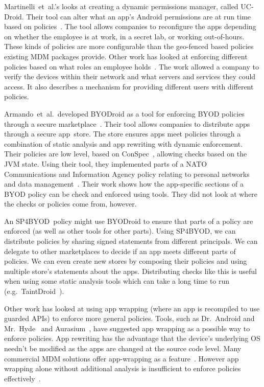 \documentclass{llncs}
\makeatletter
\newcommand{\etal}{et~al.\@}
\newcommand{\AppPAL}[0]{SP4BYOD}
\makeatother
\begin{document}
Martinelli~\etal{}'s looks at creating a dynamic permissions manager, called UC-Droid.
Their tool can alter what an app's Android permissions are at run time based on policies~\cite{martinelli_enhancing_2016}.
The tool allows companies to reconfigure the apps depending on whether the employee is at work, in a secret lab, or working out-of-hours.
These kinds of policies are more configurable than the geo-fenced based policies existing MDM packages provide.
Other work has looked at enforcing different policies based on what roles an employee holds~\cite{costantino_towards_2013}.
The work allowed a company to verify the devices within their network and what servers and services they could access.
It also describes a mechanism for providing different users with different policies.

Armando~\etal~developed BYODroid as a tool for enforcing BYOD policies through a secure marketplace~\cite{armando_enabling_2014}.
Their tool allows companies to distribute apps through a secure app~store.
The store ensures apps meet policies through a combination of static analysis and app rewriting with dynamic enforcement.
Their policies are low level, based on ConSpec~\cite{aktug_conspec_2008}, allowing checks based on the JVM state.
Using their tool, they implemented parts of a NATO Communications and Information Agency policy relating to personal networks and data management~\cite{armando_developing_2016}.
Their work shows how the app-specific sections of a BYOD policy can be check and enforced using tools.
They did not look at where the checks or policies come from, however.

An \AppPAL~policy might use BYODroid to ensure that parts of a policy are enforced (as well as other tools for other parts).
Using \AppPAL, we can distribute policies by sharing signed statements from different principals.
We can delegate to other marketplaces to decide if an app meets different parts of policies.
We can even create new stores by composing their policies and using multiple store's statements about the apps.
Distributing checks like this is useful when using some static analysis tools which can take a long time to run (e.g.~TaintDroid~\cite{enck_taintdroid:_2014}).

Other work has looked at using app wrapping (where an app is recompiled to use guarded APIs) to enforce more general policies.
Tools, such as Dr.~Android and Mr.~Hyde~\cite{jeon_dr._2012} and Aurasium~\cite{xu_aurasium:_2012}, have suggested app wrapping as a possible way to enforce policies.
App rewriting has the advantage that the device's underlying OS needn't be modified as the apps are changed at the source code level.
Many commercial \ac{MDM} solutions offer app-wrapping as a feature~\cite{_ibm_????,_app_????}. 
However app wrapping alone without additional analysis is insufficient to enforce policies effectively~\cite{hao_effectiveness_2013}.
\end{document}
